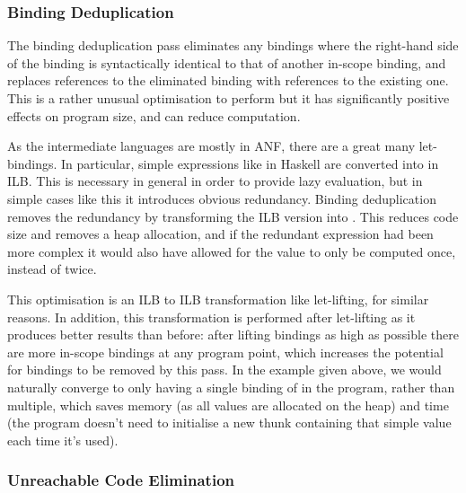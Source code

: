 \documentclass[dissertation.tex]{subfiles}
\begin{document}
{{{        }
        \subsubsection{Binding Deduplication}\label{sec:binding-dedupe}
        {

            The binding deduplication pass eliminates any bindings where the right-hand side of the binding is
            syntactically identical to that of another in-scope binding, and replaces references to the eliminated
            binding with references to the existing one. This is a rather unusual optimisation to perform but it has
            significantly positive effects on program size, and can reduce computation.

            As the intermediate languages are mostly in ANF, there are a great many let-bindings. In particular, simple
            expressions like  in Haskell are converted into  in ILB. This is necessary in general in order to provide lazy evaluation, but in simple
            cases like this it introduces obvious redundancy. Binding deduplication removes the redundancy by
            transforming the ILB version into . This reduces code size and removes
            a heap allocation, and if the redundant expression had been more complex it would also have allowed for the
            value to only be computed once, instead of twice.

            This optimisation is an ILB to ILB transformation like let-lifting, for similar reasons. In addition, this
            transformation is performed after let-lifting as it produces better results than before: after lifting
            bindings as high as possible there are more in-scope bindings at any program point, which increases the
            potential for bindings to be removed by this pass. In the  example given above, we
            would naturally converge to only having a single binding of  in the program, rather than
            multiple, which saves memory (as all values are allocated on the heap) and time (the program doesn't need to
            initialise a new thunk containing that simple value each time it's used).


        }
        \subsubsection{Unreachable Code Elimination}\label{sec:unreachable-elim}
        {

}}}
\end{document}
